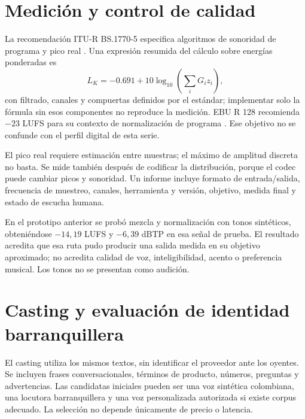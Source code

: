 \section{Medición y control de calidad}
La recomendación ITU-R BS.1770-5 especifica algoritmos de sonoridad de programa y pico real \cite{itu}. Una expresión resumida del cálculo sobre energías ponderadas es
\begin{equation}
 L_K=-0.691+10\log_{10}\left(\sum_iG_iz_i\right),
\end{equation}
con filtrado, canales y compuertas definidos por el estándar; implementar solo la fórmula sin esos componentes no reproduce la medición. EBU R 128 recomienda $-23$ LUFS para su contexto de normalización de programa \cite{ebu}. Ese objetivo no se confunde con el perfil digital de esta serie.

El pico real requiere estimación entre muestras; el máximo de amplitud discreta no basta. Se mide también después de codificar la distribución, porque el codec puede cambiar picos y sonoridad. Un informe incluye formato de entrada/salida, frecuencia de muestreo, canales, herramienta y versión, objetivo, medida final y estado de escucha humana.

En el prototipo anterior se probó mezcla y normalización con tonos sintéticos, obteniéndose $-14{,}19$ LUFS y $-6{,}39$ dBTP en esa señal de prueba. El resultado acredita que esa ruta pudo producir una salida medida en su objetivo aproximado; no acredita calidad de voz, inteligibilidad, acento o preferencia musical. Los tonos no se presentan como audición.

\section{Casting y evaluación de identidad barranquillera}
El casting utiliza los mismos textos, sin identificar el proveedor ante los oyentes. Se incluyen frases conversacionales, términos de producto, números, preguntas y advertencias. Las candidatas iniciales pueden ser una voz sintética colombiana, una locutora barranquillera y una voz personalizada autorizada si existe corpus adecuado. La selección no depende únicamente de precio o latencia.

